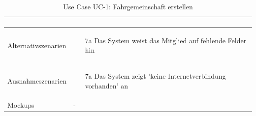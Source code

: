 \begin{table}[ht]
\begin{tabular}{ l | p{10cm} }
\begin{enumerate}
					\end{enumerate}
					\\ \hline
	Alternativszenarien	&	\begin{enumerate}
					\item[7a] Das System weist das Mitglied auf fehlende Felder hin
					\end{enumerate}
					\\ \hline
	Ausnahmeszenarien&	\begin{enumerate}
					\item[7a] Das System zeigt 'keine Internetverbindung vorhanden' an
					\end{enumerate}
					\\ \hline
	Mockups	 	&	-
  \end{tabular}
   \caption{Use Case UC-1: Fahrgemeinschaft erstellen}\label{table:use_case_1}
\end{table}


